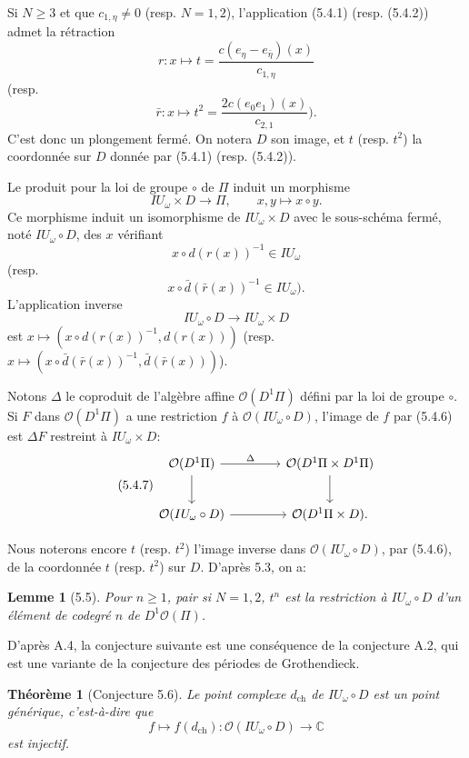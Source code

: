 \documentclass[10pt,a4paper]{article}
\newcommand{\OO}{\mathcal O}
\newcommand{\C}{\mathbb C}
\theoremstyle{deligne}
\newtheorem*{theorem*}{Théorème}
\newtheorem*{lemma*}{Lemme}
\begin{document}
Si \(N\ge3\) et que \(c_{1,\eta}\ne0\) (resp. \(N=1,2\)), l'application (5.4.1) (resp. (5.4.2)) admet la rétraction
\[
r:x\longmapsto t=\frac{c(e_\eta-e_{\bar\eta})(x)}{c_{1,\eta}}
\]
(resp.
\[
\tag{5.4.3}
\bar r:x\longmapsto t^2=\frac{2c(e_0e_1)(x)}{c_{2,1}}).
\]
C'est donc un plongement fermé. On notera \(D\) son image, et \(t\) (resp. \(t^2\)) la coordonnée sur \(D\) donnée par (5.4.1) (resp. (5.4.2)).

Le produit pour la loi de groupe \(\circ\) de \(\Pi\) induit un morphisme
\[
\tag{5.4.4}
IU_\omega\times D\longrightarrow\Pi,\qquad x,y\longmapsto x\circ y.
\]
Ce morphisme induit un isomorphisme de \(IU_\omega\times D\) avec le sous-schéma fermé, noté \(IU_\omega\circ D\), des \(x\) vérifiant
\[
x\circ d(r(x))^{-1}\in IU_\omega
\]
(resp.
\[
\tag{5.4.5}
x\circ\bar d(\bar r(x))^{-1}\in IU_\omega).
\]
L'application inverse
\[
\tag{5.4.6}
IU_\omega\circ D\longrightarrow IU_\omega\times D
\]
est \(x\mapsto(x\circ d(r(x))^{-1},d(r(x)))\) (resp. \(x\mapsto(x\circ\bar d(\bar r(x))^{-1},\bar d(\bar r(x)))\)).

Notons \(\Delta\) le coproduit de l'algèbre affine \(\OO(D^1\Pi)\) défini par la loi de groupe \(\circ\). Si \(F\) dans \(\OO(D^1\Pi)\) a une restriction \(f\) à \(\OO(IU_\omega\circ D)\), l'image de \(f\) par (5.4.6) est \(\Delta F\) restreint à \(IU_\omega\times D\):
\[
\tag{5.4.7}
\begin{tikzcd}[column sep=4.0em,row sep=2.2em]
\OO(D^1\Pi) \arrow[r,"\Delta"] \arrow[d] &
\OO(D^1\Pi\times D^1\Pi) \arrow[d]\\
\OO(IU_\omega\circ D) \arrow[r] &
\OO(D^1\Pi\times D).
\end{tikzcd}
\]

Nous noterons encore \(t\) (resp. \(t^2\)) l'image inverse dans \(\OO(IU_\omega\circ D)\), par (5.4.6), de la coordonnée \(t\) (resp. \(t^2\)) sur \(D\). D'après 5.3, on a:

\begin{lemma*}[5.5]
Pour \(n\ge1\), pair si \(N=1,2\), \(t^n\) est la restriction à \(IU_\omega\circ D\) d'un élément de codegré \(n\) de \(D^1\OO(\Pi)\).
\end{lemma*}

D'après A.4, la conjecture suivante est une conséquence de la conjecture A.2, qui est une variante de la conjecture des périodes de Grothendieck.

\begin{theorem*}[Conjecture 5.6]
Le point complexe \(d_{\mathrm{ch}}\) de \(IU_\omega\circ D\) est un point générique, c'est-à-dire que
\[
\tag{5.6.1}
f\longmapsto f(d_{\mathrm{ch}}):\OO(IU_\omega\circ D)\longrightarrow\C
\]
est injectif.
\end{theorem*}
\end{document}
